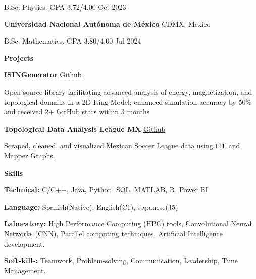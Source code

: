 \documentclass[6pt]{article}
\begin{document}
B.Sc. Physics. GPA 3.72/4.00 \hfill Oct 2023

\textbf{Universidad Nacional Autónoma de México} \hfill CDMX, Mexico

B.Sc. Mathematics. GPA 3.80/4.00 \hfill Jul 2024

\vspace{10pt}
\begin{center}
    \textbf{Projects}
\end{center}
\textbf{ISINGenerator} \hfill \href{https://github.com/erick-rios/ISINGenerator}{Github}

Open-source library facilitating advanced analysis of energy, magnetization, and topological domains in a 2D Ising Model; enhanced simulation accuracy by 50\% and received 2+ GitHub stars within 3 months

\textbf{Topological Data Analysis League MX} \hfill \href{https://github.com/erick-rios/topological_data_analysis_mx_league}{Github}

Scraped, cleaned, and visualized Mexican Soccer League data using \texttt{ETL} and Mapper Graphs.

\vspace{10pt}
\begin{center}
    \textbf{Skills}
\end{center}
\textbf{Technical:} C/C++, Java, Python, SQL, MATLAB, R, Power BI

\textbf{Language:} Spanish(Native), English(C1), Japanese(J5)

\textbf{Laboratory:} High Performance Computing (HPC) tools, Convolutional Neural Networks (CNN), Parallel computing techniques, Artificial Intelligence development.

\textbf{Softskills:} Teamwork, Problem-solving, Communication, Leadership, Time Management.
\end{document}
